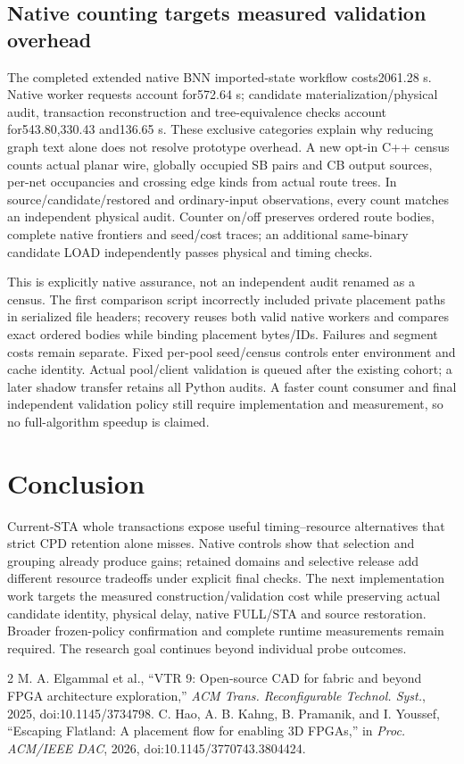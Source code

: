 \documentclass[conference,10pt]{IEEEtran}
\begin{document}
\subsection{Native counting targets measured validation overhead}
The completed extended native BNN imported-state workflow costs2061.28 s. Native worker requests account for572.64 s; candidate materialization/physical audit, transaction reconstruction and tree-equivalence checks account for543.80,330.43 and136.65 s. These exclusive categories explain why reducing graph text alone does not resolve prototype overhead. A new opt-in C++ census counts actual planar wire, globally occupied SB pairs and CB output sources, per-net occupancies and crossing edge kinds from actual route trees. In source/candidate/restored and ordinary-input observations, every count matches an independent physical audit. Counter on/off preserves ordered route bodies, complete native frontiers and seed/cost traces; an additional same-binary candidate LOAD independently passes physical and timing checks.

This is explicitly native assurance, not an independent audit renamed as a census. The first comparison script incorrectly included private placement paths in serialized file headers; recovery reuses both valid native workers and compares exact ordered bodies while binding placement bytes/IDs. Failures and segment costs remain separate. Fixed per-pool seed/census controls enter environment and cache identity. Actual pool/client validation is queued after the existing cohort; a later shadow transfer retains all Python audits. A faster count consumer and final independent validation policy still require implementation and measurement, so no full-algorithm speedup is claimed.

\section{Conclusion}
Current-STA whole transactions expose useful timing--resource alternatives that strict CPD retention alone misses. Native controls show that selection and grouping already produce gains; retained domains and selective release add different resource tradeoffs under explicit final checks. The next implementation work targets the measured construction/validation cost while preserving actual candidate identity, physical delay, native FULL/STA and source restoration. Broader frozen-policy confirmation and complete runtime measurements remain required. The research goal continues beyond individual probe outcomes.

\begin{thebibliography}{2}
 M. A. Elgammal et al., ``VTR 9: Open-source CAD for fabric and beyond FPGA architecture exploration,'' \emph{ACM Trans. Reconfigurable Technol. Syst.}, 2025, doi:10.1145/3734798.
 C. Hao, A. B. Kahng, B. Pramanik, and I. Youssef, ``Escaping Flatland: A placement flow for enabling 3D FPGAs,'' in \emph{Proc. ACM/IEEE DAC}, 2026, doi:10.1145/3770743.3804424.
\end{thebibliography}
\end{document}
